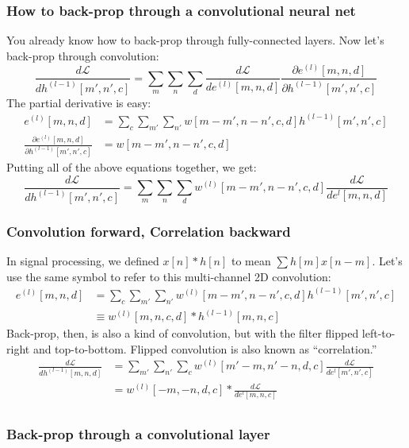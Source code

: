 \documentclass{beamer}
\begin{document}
\begin{frame}
  \frametitle{How to back-prop through a convolutional neural net}

  You already know how to back-prop through fully-connected layers.  Now let's
  back-prop through convolution:
  \begin{displaymath}
    \frac{d{\mathcal L}}{dh^{(l-1)}[m',n',c]} =
    \sum_{m}\sum_n\sum_d\frac{d{\mathcal L}}{de^{(l)}[m,n,d]}
    \frac{\partial e^{(l)}[m,n,d]}{\partial h^{(l-1)}[m',n',c]}
  \end{displaymath}
  The partial derivative is easy:
  \begin{align*}
    e^{(l)}[m,n,d] &= \sum_c\sum_{m'}\sum_{n'} w[m-m',n-n',c,d]h^{(l-1)}[m',n',c]\\
    \frac{\partial e^{(l)}[m,n,d]}{\partial h^{(l-1)}[m',n',c]} &= w[m-m',n-n',c,d]
  \end{align*}
  Putting all of the above equations together, we get:
  \begin{displaymath}
    \frac{d{\mathcal L}}{dh^{(l-1)}[m',n',c]} =
    \sum_{m}\sum_n\sum_d w^{(l)}[m-m',n-n',c,d]\frac{d{\mathcal L}}{de^{l}[m,n,d]}
  \end{displaymath}
\end{frame}

\begin{frame}
  \frametitle{Convolution forward, Correlation backward}

  In signal processing, we defined $x[n]\ast h[n]$ to mean $\sum
  h[m]x[n-m]$.  Let's use the same symbol to refer to this
  multi-channel 2D convolution:
  \begin{align*}
    e^{(l)}[m,n,d] &= \sum_c\sum_{m'}\sum_{n'} w^{(l)}[m-m',n-n',c,d]h^{(l-1)}[m',n',c]\\
    &\equiv w^{(l)}[m,n,c,d] \ast h^{(l-1)}[m,n,c]
  \end{align*}
  Back-prop, then, is also a kind of convolution, but with the filter
  flipped left-to-right and top-to-bottom.  Flipped convolution is also
  known as ``correlation.''
  \begin{align*}
    \frac{d{\mathcal L}}{dh^{(l-1)}[m,n,d]} &=
    \sum_{m'}\sum_{n'}\sum_c w^{(l)}[m'-m,n'-n,d,c]\frac{d{\mathcal L}}{de^{l}[m',n',c]}\\
    &= w^{(l)}[-m,-n,d,c] \ast \frac{d{\mathcal L}}{de^{l}[m,n,c]}\\
  \end{align*}
\end{frame}

\begin{frame}
  \frametitle{Back-prop through a convolutional layer}

  \centerline{}
\end{frame}
\end{document}
